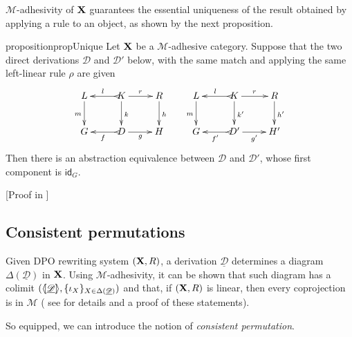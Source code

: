 \documentclass[a4paper,UKenglish,cleveref,pdftex,thm-restate,numberwithinsect,anonymous]{lipics}
\newcommand{\id}[1]{\mathsf{id}_{#1}}
\def\R{\mathsf{R}}
\def\X{\textbf {\textup{X}}}
\def\G{\textbf {\textup{G}}}
\newcommand{\dder}[1]{\mathscr{#1}}
\newcommand{\der}[1]{\underline{\dder{#1}}}
\newcommand{\lpro}{\langle \hspace{-1.85pt}[}
\newcommand{\rpro}{]\hspace{-1.85pt}\rangle}
\newcommand{\tpro}[1]{\lpro \der{#1}\rpro}
\begin{document}
$\mathcal{M}$-adhesivity of $\X$ guarantees the essential uniqueness of
the result obtained by applying a rule to an object, as shown by the next
proposition.


\begin{restatable}{proposition}{propUnique}
  \label{prop:unique}
  Let $\X$ be a $\mathcal{M}$-adhesive category. Suppose that the two
  direct derivations $\dder{D}$ and $\dder{D}'$ below, with the same
  match and applying the same left-linear rule $\rho$ are given
  \[\xymatrix{L \ar[d]_{m}& K \ar[d]^{k}\ar@{>->}[l]_{l} \ar[r]^{r} &
      R \ar[d]^{h} & L \ar[d]_{m}& K \ar[d]^{k'}\ar@{>->}[l]_{l}
      \ar[r]^{r} & R \ar[d]^{h'}\\G & \ar@{>->}[l]^{f} D \ar[r]_{g}& H
      & G & \ar@{>->}[l]^{f'} D' \ar[r]_{g'}& H'}\]
  Then there is an abstraction equivalence between $\dder{D}$ and
  $\dder{D}'$, whose first component is $\id{G}$.
\end{restatable}

[Proof in ]


\iffalse
\subsection{Consistent permutations}

Given DPO rewriting system $(\X, \R)$,  a derivation $\der{D}$ determines a diagram
$\Delta(\der{D})$ in $\X$. Using $\mathcal{M}$-adhesivity, it can be shown  that such diagram has a colimit $(\tpro{D}, \{\iota_X\}_{X\in \Delta(\der{D})})$ and that, if $(\X, \R)$ is linear, then every coprojection is in $\mathcal{M}$ ( see  for details and a proof of these statements).


So equipped, we can introduce the notion of \emph{consistent permutation}.
\end{document}

